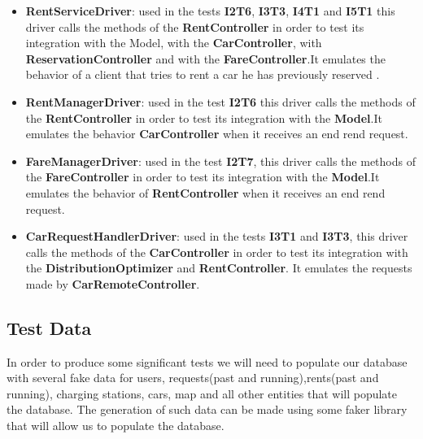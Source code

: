 \begin{itemize}
\item \textbf{RentServiceDriver}: used in the tests \textbf{I2T6}, \textbf{I3T3}, \textbf{I4T1} and \textbf{I5T1}  this driver calls the methods of the \textbf{RentController} in order to test its integration with the Model, with the \textbf{CarController}, with \textbf{ReservationController} and with the \textbf{FareController}.It emulates the behavior of a client that tries to rent a car he has previously reserved .
\item \textbf{RentManagerDriver}: used in the test \textbf{I2T6}  this driver calls the methods of the \textbf{RentController} in order to test its integration with the \textbf{Model}.It emulates the behavior  \textbf{CarController} when it receives an end rend request. 
\item \textbf{FareManagerDriver}: used in the test \textbf{I2T7},  this driver calls the methods of the \textbf{FareController} in order to test its integration with the \textbf{Model}.It emulates the behavior of  \textbf{RentController} when it receives an end rend request. 
\item \textbf{CarRequestHandlerDriver}: used in the tests \textbf{I3T1} and \textbf{I3T3},  this driver calls the methods of the \textbf{CarController} in order to test its integration with the \textbf{DistributionOptimizer} and \textbf{RentController}. It emulates the requests made by \textbf{CarRemoteController}. 
\end{itemize}


\subsection{Test Data}
In order to produce some significant tests we  will need to populate our database with several fake data  for users, requests(past and running),rents(past and running), charging stations, cars, map and all other entities that will populate the database. 
The generation of such data can be made using some faker library that will allow us to populate the database.

